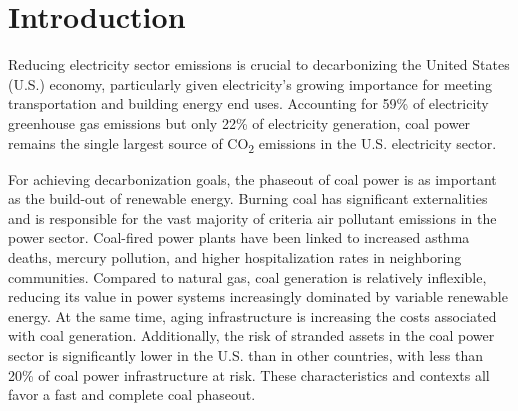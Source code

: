 \setlength{\parindent}{20pt}


\section{Introduction}


Reducing electricity sector emissions is crucial to decarbonizing the United States (U.S.) economy, particularly given electricity's growing importance for meeting transportation and building energy end uses. Accounting for 59\% of electricity greenhouse gas emissions but only 22\% of electricity generation, coal power remains the single largest source of CO\textsubscript{2} emissions in the U.S. electricity sector.

For achieving decarbonization goals, the phaseout of coal power is as important as the build-out of renewable energy.
Burning coal has significant externalities and is responsible for the vast majority of criteria air pollutant emissions in the power sector.
Coal-fired power plants have been linked to increased asthma deaths, mercury pollution, and higher hospitalization rates in neighboring communities.
Compared to natural gas, coal generation is relatively inflexible, reducing its value in power systems increasingly dominated by variable renewable energy. At the same time, aging infrastructure is increasing the costs associated with coal generation.
Additionally, the risk of stranded assets in the coal power sector is significantly lower in the U.S. than in other countries, with less than 20\% of coal power infrastructure at risk.
These characteristics and contexts all favor a fast and complete coal phaseout. 

